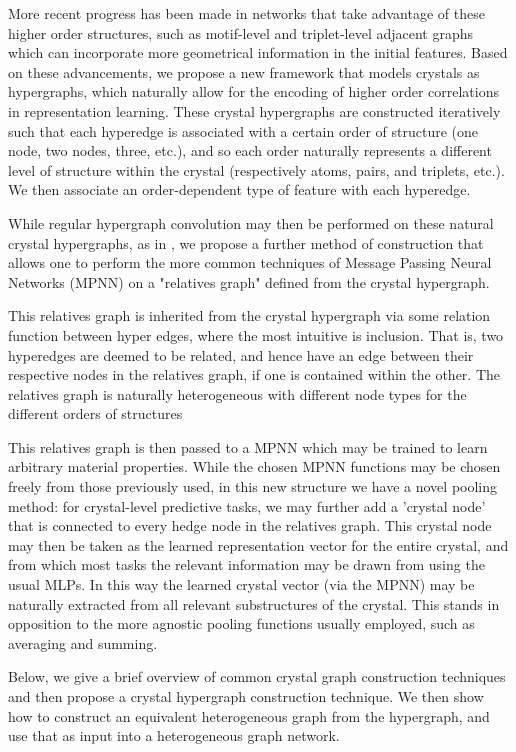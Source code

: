 \documentclass{article}
\begin{document}
More recent progress has been made in networks that take advantage of these higher order structures, such as motif-level \cite{banjade2021structure} and triplet-level \cite{choudhary2021atomistic} adjacent graphs
which can incorporate more geometrical information in the initial features.
Based on these advancements, we propose a new framework that models crystals as hypergraphs, which naturally allow for the encoding of higher order correlations in representation learning. These crystal hypergraphs are constructed iteratively such that each hyperedge is associated with a certain order of structure (one node, two nodes, three, etc.), and so each order naturally represents a different level of structure within the crystal (respectively atoms, pairs, and triplets, etc.). We then associate an order-dependent type of feature with each hyperedge.

While regular hypergraph convolution may then be performed on these natural crystal hypergraphs, as in \cite{jo2021edge}
, we propose a further method of construction that allows one to perform the more common techniques of Message Passing Neural Networks (MPNN) on a "relatives graph" defined from the crystal hypergraph.

This relatives graph is inherited from the crystal hypergraph via some relation function between hyper edges, where the most intuitive is inclusion. That is, two hyperedges are deemed to be related, and hence have an edge between their respective nodes in the relatives graph, if one is contained within the other. The relatives graph is naturally heterogeneous with different node types for the different orders of structures

This relatives graph is then passed to a MPNN which may be trained to learn arbitrary material properties. While the chosen MPNN functions may be chosen freely from those previously used, in this new structure we have a novel pooling method: for crystal-level predictive tasks, we may further add a 'crystal node' that is connected to every hedge node in the relatives graph. This crystal node may then be taken as the learned representation vector for the entire crystal, and from which most tasks the relevant information may be drawn from using the usual MLPs. In this way the learned crystal vector (via the MPNN) may be naturally extracted from all relevant substructures of the crystal. This stands in opposition to the more agnostic pooling functions usually employed, such as averaging and summing.

Below, we give a brief overview of common crystal graph construction techniques and then propose a crystal hypergraph construction technique. We then show how to construct an equivalent heterogeneous graph from the hypergraph, and use that as input into a heterogeneous graph network.
\end{document}
